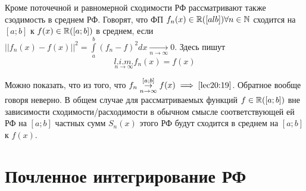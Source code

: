 \documentclass[../../main.tex]{subfiles}
\begin{document}
	\begin{rem}
		Кроме поточечной и равномерной сходимости РФ
		рассматривают также сзодимость в среднем РФ.
		Говорят, что ФП $ f_n(x) \in \mathbb{R}([al b]) \forall
		n \in \mathbb{N} $ сходится на $ [a; b] $ к $ f(x) \in 
		\mathbb{R}([a; b]) $ в среднем, если $ ||f_n(x) - f(x)||^2=
		\int\limits_{a}^b (f_n - f)^2 dx \underset{n \to \infty}{\to} 0 $.
		Здесь пишут 
		\begin{equation}
		\label{lec20:19}
			\underset{n \to \infty}{l.i.m.} f_n(x) = f(x) 
		\end{equation}
	\end{rem}
	Можно показать, что из того, что $ f_n 
	\stackrel{[a; b]}{\underset{n \to \infty}{\to}} f(x) 
	\implies \eqref{lec20:19} $. Обратное вообще говоря неверно.
	В общем случае для рассматриваемых функций $ f \in \mathbb{R}([a;b]) $
	вне зависимости сходимости/расходимости в обычном смысле соответствующей ей
	РФ на $ [a; b] $ частных сумм $ S_n(x) $ этого РФ
	будут сходится в среднем на $ [a; b] $ к $ f(x) $.
	
	\section{Почленное интегрирование РФ}
	
\end{document}

